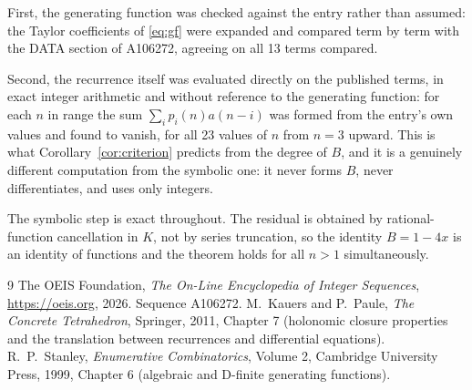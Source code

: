 \documentclass[11pt,a4paper]{article}
\theoremstyle{plain}
\theoremstyle{definition}
\begin{document}
First, the generating function was checked against the entry rather than assumed: the
Taylor coefficients of \eqref{eq:gf} were expanded and compared term by term with the DATA
section of A106272, agreeing on all 13 terms compared.

Second, the recurrence itself was evaluated directly on the published terms, in exact
integer arithmetic and without reference to the generating function: for each $n$ in range
the sum $\sum_{i}p_{i}(n)a(n-i)$ was formed from the entry's own values and found to
vanish, for all 23 values of $n$ from $n=3$ upward. This is what
Corollary~\ref{cor:criterion} predicts from the degree of $B$, and it is a genuinely
different computation from the symbolic one: it never forms $B$, never differentiates, and
uses only integers.

The symbolic step is exact throughout. The residual is obtained by rational-function
cancellation in $K$, not by series truncation, so the identity $B=1 - 4 x$ is an
identity of functions and the theorem holds for all $n>1$ simultaneously.

\begin{thebibliography}{9}
 The OEIS Foundation, \emph{The On-Line Encyclopedia of Integer Sequences},
\url{https://oeis.org}, 2026. Sequence A106272.
 M.~Kauers and P.~Paule, \emph{The Concrete Tetrahedron}, Springer, 2011,
Chapter 7 (holonomic closure properties and the translation between recurrences and
differential equations).
 R.~P.~Stanley, \emph{Enumerative Combinatorics}, Volume 2, Cambridge
University Press, 1999, Chapter 6 (algebraic and D-finite generating functions).
\end{thebibliography}
\end{document}
